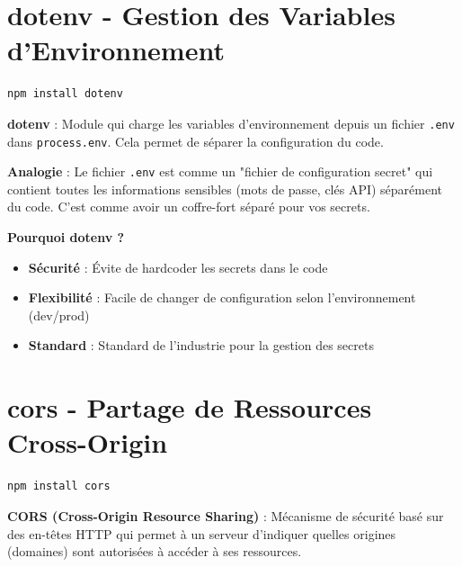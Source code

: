 \section{dotenv - Gestion des Variables d'Environnement}

\begin{lstlisting}[style=bash, caption=Installation de dotenv]
npm install dotenv
\end{lstlisting}

\begin{definitionbox}
    \textbf{dotenv} : Module qui charge les variables d'environnement depuis un fichier \texttt{.env} dans \texttt{process.env}. Cela permet de séparer la configuration du code.
\end{definitionbox}

\begin{analogybox}
    \textbf{Analogie} : Le fichier \texttt{.env} est comme un "fichier de configuration secret" qui contient toutes les informations sensibles (mots de passe, clés API) séparément du code. C'est comme avoir un coffre-fort séparé pour vos secrets.
\end{analogybox}

\textbf{Pourquoi dotenv ?}
\begin{itemize}
    \item \textbf{Sécurité} : Évite de hardcoder les secrets dans le code
    \item \textbf{Flexibilité} : Facile de changer de configuration selon l'environnement (dev/prod)
    \item \textbf{Standard} : Standard de l'industrie pour la gestion des secrets
\end{itemize}

\section{cors - Partage de Ressources Cross-Origin}

\begin{lstlisting}[style=bash, caption=Installation de cors]
npm install cors
\end{lstlisting}

\begin{definitionbox}
    \textbf{CORS (Cross-Origin Resource Sharing)} : Mécanisme de sécurité basé sur des en-têtes HTTP qui permet à un serveur d'indiquer quelles origines (domaines) sont autorisées à accéder à ses ressources.
\end{definitionbox}

